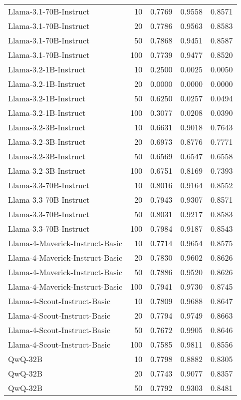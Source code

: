 \begin{tabular}{lrrrr}
Llama-3.1-70B-Instruct & 10 & 0.7769 & 0.9558 & 0.8571 \\
Llama-3.1-70B-Instruct & 20 & 0.7786 & 0.9563 & 0.8583 \\
Llama-3.1-70B-Instruct & 50 & 0.7868 & 0.9451 & 0.8587 \\
Llama-3.1-70B-Instruct & 100 & 0.7739 & 0.9477 & 0.8520 \\
Llama-3.2-1B-Instruct & 10 & 0.2500 & 0.0025 & 0.0050 \\
Llama-3.2-1B-Instruct & 20 & 0.0000 & 0.0000 & 0.0000 \\
Llama-3.2-1B-Instruct & 50 & 0.6250 & 0.0257 & 0.0494 \\
Llama-3.2-1B-Instruct & 100 & 0.3077 & 0.0208 & 0.0390 \\
Llama-3.2-3B-Instruct & 10 & 0.6631 & 0.9018 & 0.7643 \\
Llama-3.2-3B-Instruct & 20 & 0.6973 & 0.8776 & 0.7771 \\
Llama-3.2-3B-Instruct & 50 & 0.6569 & 0.6547 & 0.6558 \\
Llama-3.2-3B-Instruct & 100 & 0.6751 & 0.8169 & 0.7393 \\
Llama-3.3-70B-Instruct & 10 & 0.8016 & 0.9164 & 0.8552 \\
Llama-3.3-70B-Instruct & 20 & 0.7943 & 0.9307 & 0.8571 \\
Llama-3.3-70B-Instruct & 50 & 0.8031 & 0.9217 & 0.8583 \\
Llama-3.3-70B-Instruct & 100 & 0.7984 & 0.9187 & 0.8543 \\
Llama-4-Maverick-Instruct-Basic & 10 & 0.7714 & 0.9654 & 0.8575 \\
Llama-4-Maverick-Instruct-Basic & 20 & 0.7830 & 0.9602 & 0.8626 \\
Llama-4-Maverick-Instruct-Basic & 50 & 0.7886 & 0.9520 & 0.8626 \\
Llama-4-Maverick-Instruct-Basic & 100 & 0.7941 & 0.9730 & 0.8745 \\
Llama-4-Scout-Instruct-Basic & 10 & 0.7809 & 0.9688 & 0.8647 \\
Llama-4-Scout-Instruct-Basic & 20 & 0.7794 & 0.9749 & 0.8663 \\
Llama-4-Scout-Instruct-Basic & 50 & 0.7672 & 0.9905 & 0.8646 \\
Llama-4-Scout-Instruct-Basic & 100 & 0.7585 & 0.9811 & 0.8556 \\
QwQ-32B & 10 & 0.7798 & 0.8882 & 0.8305 \\
QwQ-32B & 20 & 0.7743 & 0.9077 & 0.8357 \\
QwQ-32B & 50 & 0.7792 & 0.9303 & 0.8481 \\

\end{tabular}
